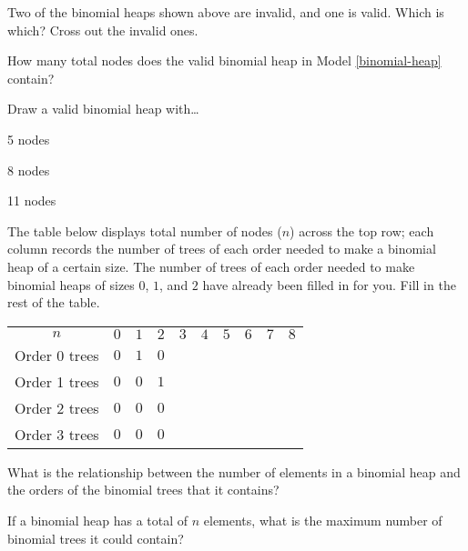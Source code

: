 \documentclass{tufte-handout}
\begin{document}
\begin{questions}
\item Two of the binomial heaps shown above are invalid, and one is
  valid.  Which is which?  Cross out the invalid ones.

\item How many total nodes does the valid binomial heap in Model
  \ref{binomial-heap} contain?

\item Draw a valid binomial heap with\dots
  \begin{subquestions}
  \item 5 nodes
  \item 8 nodes
  \item 11 nodes
  \end{subquestions}

\item The table below displays total number of nodes ($n$) across the
  top row; each column records the number of trees of each order
  needed to make a binomial heap of a certain size.  The number of
  trees of each order needed to make binomial heaps of sizes $0$, $1$,
  and $2$ have already been filled in for you.  Fill in the rest of
  the table. \bigskip

  \begin{tabular}{c|ccccccccc}
    $n$ & $0$ & $1$ & $2$ & $3$ & $4$ & $5$ & $6$ & $7$ & $8$ \\[8pt]
    Order 0 trees & $0$ & $1$ & $0$ & & & & & & \\[8pt]
    Order 1 trees & $0$ & $0$ & $1$ & & & & & & \\[8pt]
    Order 2 trees & $0$ & $0$ & $0$ & & & & & & \\[8pt]
    Order 3 trees & $0$ & $0$ & $0$ & & & & & & \\[8pt]
  \end{tabular}

\item What is the relationship between the number of elements in a
  binomial heap and the orders of the binomial trees that it contains?

\item If a binomial heap has a total of $n$ elements, what is the
  maximum number of binomial trees it could contain?



\end{questions}
\end{document}
